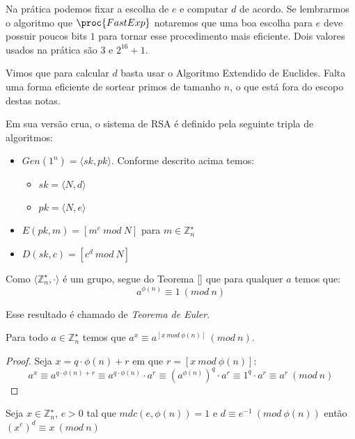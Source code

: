 Na prática podemos fixar a escolha de $e$ e computar $d$ de acordo.
Se lembrarmos o algoritmo que $\proc{FastExp}$ notaremos que uma boa escolha para $e$ deve possuir poucos bits $1$ para tornar esse procedimento mais eficiente.
Dois valores usados na prática são $3$ e $2^{16}+1$.

Vimos que para calcular $d$ basta usar o Algoritmo Extendido de Euclides.
Falta uma forma eficiente de sortear primos de tamanho $n$, o que está fora do escopo destas notas.

Em sua versão crua, o sistema de RSA é definido pela seguinte tripla de algoritmos:

\begin{itemize}
\item $Gen(1^n) = \langle sk, pk \rangle$. Conforme descrito acima temos:
\begin{itemize}
\item $sk = \langle N, d \rangle$
\item $pk = \langle N, e \rangle$ 
\end{itemize}
\item $E(pk, m) = [m^e\ mod\ N]$ para $m \in \mathbb{Z}_n^\star$
\item $D(sk, c) = [c^d\ mod\ N]$
\end{itemize}

Como $\langle \mathbb{Z}_n^\star, \cdot \rangle$ é um grupo, segue do Teorema \ref{} que para qualquer $a$ temos que:
\begin{displaymath}
  a^{\phi(n)} \equiv 1\ (mod\ n)
\end{displaymath}

Esse resultado é chamado de {\em Teorema de Euler}.

\begin{corollary}
  Para todo $a \in \mathbb{Z}_n^\star$ temos que $a^x \equiv a^{[x\ mod\ \phi(n)]}\ (mod\ n)$.
\end{corollary}
\begin{proof}
  Seja $x = q \cdot \phi(n) + r$ em que $r = [x\ mod\ \phi(n)]$:
  \begin{displaymath}
    a^x \equiv a^{q \cdot \phi(n) + r} \equiv a^{q \cdot \phi(n)} \cdot a^r \equiv (a^{\phi(n)})^q \cdot a^r \equiv 1^q \cdot a^r \equiv a^r\ (mod\ n)
  \end{displaymath}
\end{proof}


\begin{corollary}
\label{cor:euler}
Seja $x \in \mathbb{Z}_n^\star$, $e > 0$ tal que $mdc(e, \phi(n)) = 1$ e $d \equiv e^{-1}\ (mod\ \phi(n))$ então $(x^e)^d \equiv x\ (mod\ n)$
\end{corollary}

